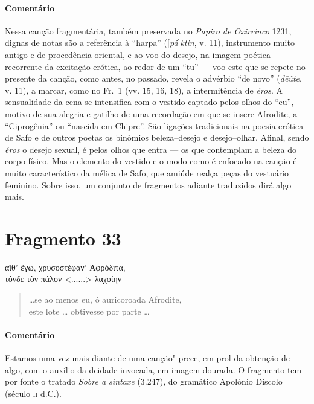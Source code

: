 {\paragraph{Comentário} Nessa canção fragmentária, também preservada no \textit{Papiro de Oxirrinco}
1231, dignas de notas são a referência à ``harpa'' ([\textit{pâ}]\textit{ktin}, v. 11), instrumento muito
antigo e de procedência oriental, e ao voo do desejo, na imagem poética
recorrente da excitação erótica, ao redor de um “tu” --- voo este que se repete
no presente da canção, como antes, no passado, revela o advérbio ``de
novo” (\textit{dēûte}, v. 11), a marcar, como no Fr.~1 (vv. 15, 16, 18), a intermitência de \textit{éros}. A sensualidade da cena se intensifica com o vestido captado pelos olhos do “eu”, motivo de sua alegria e gatilho de uma recordação em que se insere Afrodite, a
``Ciprogênia'' ou “nascida em Chipre”. São ligações tradicionais na
poesia erótica de Safo e de outros poetas os binômios beleza--desejo e
desejo--olhar. Afinal, sendo \textit{éros} o desejo sexual, é pelos olhos que entra --- os que contemplam a beleza do corpo físico. Mas o elemento do vestido e o modo como é enfocado na canção é muito característico da mélica de Safo, que amiúde realça peças do vestuário feminino. Sobre isso, um conjunto de fragmentos adiante traduzidos dirá algo mais.}


\pagebreak

\section{Fragmento 33}

\begin{gkverse}
αἴθ’ ἔγω, χρυσοστέφαν’ Ἀφρόδιτα,\\
τόνδε τὸν πάλον <......> λαχοίην
\end{gkverse}

\begin{verse}
\ldots{}se ao menos eu, ó auricoroada Afrodite,\\
este lote \ldots{} obtivesse por parte \ldots{}
\end{verse}

{\paragraph{Comentário} Estamos uma vez mais diante de uma canção"-prece, em prol da obtenção de algo,
com o auxílio da deidade invocada, em imagem dourada. O fragmento tem por fonte
o tratado \textit{Sobre a sintaxe} (3.247), do gramático Apolônio Díscolo (século
\textsc{ii} d.C.).}

